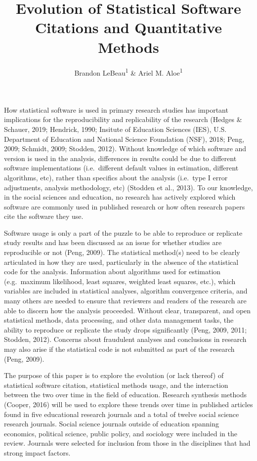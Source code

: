 \documentclass[
  english,
  ,man]{apa7}
\title{Evolution of Statistical Software Citations and Quantitative Methods}
\author{Brandon LeBeau\textsuperscript{1} \& Ariel M. Aloe\textsuperscript{1}}
\date{}
\affiliation{\vspace{0.5cm}\textsuperscript{1} University of Iowa}
\begin{document}
\maketitle

How statistical software is used in primary research studies has important implications for the reproducibility and replicability of the research (Hedges \& Schauer, 2019; Hendrick, 1990; Insitute of Education Sciences (IES), U.S. Department of Education and National Science Foundation (NSF), 2018; Peng, 2009; Schmidt, 2009; Stodden, 2012). Without knowledge of which software and version is used in the analysis, differences in results could be due to different software implementations (i.e.~different default values in estimation, different algorithms, etc), rather than specifics about the analysis (i.e.~type I error adjustments, analysis methodology, etc) (Stodden et al., 2013). To our knowledge, in the social sciences and education, no research has actively explored which software are commonly used in published research or how often research papers cite the software they use.

Software usage is only a part of the puzzle to be able to reproduce or replicate study results and has been discussed as an issue for whether studies are reproducible or not (Peng, 2009). The statistical method(s) need to be clearly articulated in how they are used, particularly in the absence of the statistical code for the analysis. Information about algorithms used for estimation (e.g.~maximum likelihood, least squares, weighted least squares, etc.), which variables are included in statistical analyses, algorithm convergence criteria, and many others are needed to ensure that reviewers and readers of the research are able to discern how the analysis proceeded. Without clear, transparent, and open statistical methods, data processing, and other data management tasks, the ability to reproduce or replicate the study drops significantly (Peng, 2009, 2011; Stodden, 2012). Concerns about fraudulent analyses and conclusions in research may also arise if the statistical code is not submitted as part of the research (Peng, 2009).

The purpose of this paper is to explore the evolution (or lack thereof) of statistical software citation, statistical methods usage, and the interaction between the two over time in the field of education. Research synthesis methods (Cooper, 2016) will be used to explore these trends over time in published articles found in five educational research journals and a total of twelve social science research journals. Social science journals outside of education spanning economics, political science, public policy, and sociology were included in the review. Journals were selected for inclusion from those in the disciplines that had strong impact factors.
\end{document}

